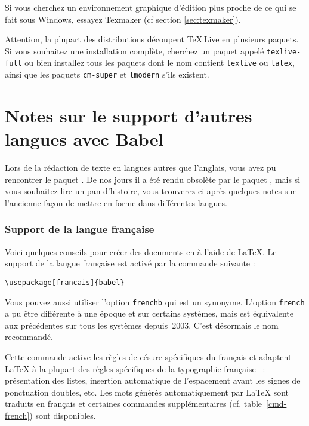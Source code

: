Si vous cherchez un environnement graphique d'édition plus proche de
ce qui se fait sous Windows, essayez Texmaker (cf section
\ref{sec:texmaker}).

Attention, la plupart des distributions découpent \TeX\,Live en
plusieurs paquets. Si vous souhaitez une installation complète,
cherchez un paquet appelé \texttt{texlive-full} ou bien installez tous
les paquets dont le nom contient \texttt{texlive} ou \texttt{latex},
ainsi que les paquets \texttt{cm-super} et \texttt{lmodern} s'ils
existent.

\chapter{Notes sur le support d'autres langues avec Babel}

\begin{intro}
Lors de la rédaction de texte en langues autres que l'anglais, vous
avez pu rencontrer le paquet . De nos jours il a été rendu
obsolète par le paquet , mais si vous souhaitez lire
un pan d'histoire, vous trouverez ci-après quelques notes sur
l'ancienne façon de mettre en forme dans différentes langues.
\end{intro}

\subsection{Support de la langue française} \label{ss-frenchb}


Voici quelques conseils pour créer des documents en
 à l'aide de \LaTeX{}. Le support de la
langue française est activé par la commande suivante :

\begin{lscommand}
\verb|\usepackage[francais]{babel}|
\end{lscommand}

Vous pouvez aussi utiliser l'option \texttt{frenchb} qui est un synonyme.
L'option \texttt{french} a pu être différente à une époque et sur certains
systèmes, mais est équivalente aux précédentes sur tous les systèmes
depuis~2003. C'est désormais le nom recommandé.

Cette commande active les règles de césure spécifiques du français et
adaptent \LaTeX{} à la plupart des règles spécifiques de la
typographie française~\cite{ftypo} : présentation des listes,
insertion automatique de l'espacement avant les signes de ponctuation
doubles, etc.  Les mots générés automatiquement par \LaTeX{} sont
traduits en français et certaines commandes supplémentaires (cf.
table~\ref{cmd-french}) sont disponibles.

